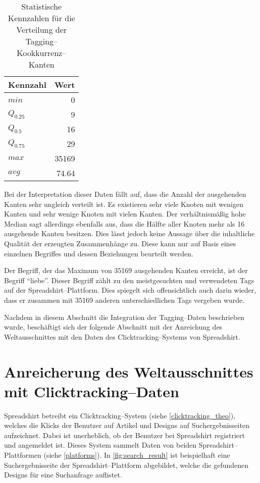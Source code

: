 \begin{table}[ht]
\centering
\begin{tabular}{lr}
    \toprule
    Kennzahl & Wert \\
    \midrule
    \(min\) & \num{0} \\
    \(Q_{0.25}\) & \num{9} \\
    \(Q_{0.5}\) & \num{16} \\
    \(Q_{0.75}\) & \num{29} \\
    \(max\) &  \num{35169} \\
    \(avg\) &  \num{74,64} \\
    \bottomrule
\end{tabular}
\caption{Statistische Kennzahlen für die Verteilung der Tagging--Kookkurrenz--Kanten}
\label{tab:only_tags}
\end{table}

Bei der Interpretation dieser Daten fällt auf, dass die Anzahl der ausgehenden Kanten sehr ungleich verteilt ist. Es existieren sehr viele Knoten mit wenigen Kanten und sehr wenige Knoten mit vielen Kanten. Der verhältnismäßig hohe Median sagt allerdings ebenfalls aus, dass die Hälfte aller Knoten mehr als \num{16} ausgehende Kanten besitzen. Dies lässt jedoch keine Aussage über die inhaltliche Qualität der erzeugten Zusammenhänge zu. Diese kann nur auf Basis eines einzelnen Begriffes und dessen Beziehungen beurteilt werden.

Der Begriff, der das Maximum von \num{35169} ausgehenden Kanten erreicht, ist der Begriff ``liebe''. Dieser Begriff zählt zu den meistgesuchten und verwendeten Tags auf der Spreadshirt--Plattform. Dies spiegelt sich offensichtlich auch darin wieder, dass er zusammen mit \num{35169} anderen unterschiedlichen Tags vergeben wurde.

Nachdem in diesem Abschnitt die Integration der Tagging--Daten beschrieben wurde, beschäftigt sich der folgende Abschnitt mit der Anreichung des Weltausschnittes mit den Daten des Clicktracking--Systems von Spreadshirt.

\section{Anreicherung des Weltausschnittes mit Clicktracking--Daten}
\label{clicktracking}

Spreadshirt betreibt ein Clicktracking--System (siehe \cref{clicktracking_theo}), welches die Klicks der Benutzer auf Artikel und Designs auf Suchergebnisseiten aufzeichnet. Dabei ist unerheblich, ob der Benutzer bei Spreadshirt registriert und angemeldet ist. Dieses System sammelt Daten von beiden Spreadshirt--Plattformen (siehe \cref{platforms}). In \cref{fig:search_result} ist beispielhaft eine Suchergebnisseite der Spreadshirt--Plattform abgebildet, welche die gefundenen Designs für eine Suchanfrage auflistet.

